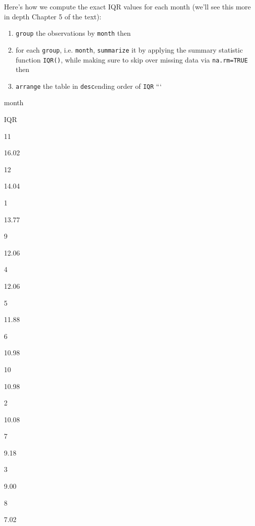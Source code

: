 \documentclass[12pt,]{krantz}
\makeatletter
\newenvironment{Shaded}{\begin{snugshade}}{\end{snugshade}}
\newcommand{\KeywordTok}[1]{\textcolor[rgb]{0.27,0.27,0.27}{\textbf{#1}}}
\newcommand{\DataTypeTok}[1]{\textcolor[rgb]{0.27,0.27,0.27}{#1}}
\newcommand{\StringTok}[1]{\textcolor[rgb]{0.5,0.5,0.5}{#1}}
\newcommand{\OtherTok}[1]{\textcolor[rgb]{0.37,0.37,0.37}{#1}}
\newcommand{\OperatorTok}[1]{\textcolor[rgb]{0.43,0.43,0.43}{\textbf{#1}}}
\newcommand{\NormalTok}[1]{#1}
\providecommand{\tightlist}{%
  \setlength{\itemsep}{0pt}\setlength{\parskip}{0pt}}
\newenvironment{kframe}{%
\medskip{}
\setlength{\fboxsep}{.8em}
 \def\at@end@of@kframe{}%
 \ifinner\ifhmode%
  \def\at@end@of@kframe{\end{minipage}}%
  \begin{minipage}{\columnwidth}%
 \fi\fi%
 \def\FrameCommand##1{\hskip\@totalleftmargin \hskip-\fboxsep
 \colorbox{shadecolor}{##1}\hskip-\fboxsep
     \hskip-\linewidth \hskip-\@totalleftmargin \hskip\columnwidth}%
 \MakeFramed {\advance\hsize-\width
   \@totalleftmargin\z@ \linewidth\hsize
   \@setminipage}}%
 {\par\unskip\endMakeFramed%
 \at@end@of@kframe}
\renewenvironment{Shaded}{\begin{kframe}}{\end{kframe}}
\makeatother
\begin{document}
Here's how we compute the exact IQR values for each month (we'll see
this more in depth Chapter 5 of the text):

\begin{enumerate}
\def\labelenumi{\arabic{enumi}.}
\tightlist
\item
  \texttt{group} the observations by \texttt{month} then
\item
  for each \texttt{group}, i.e. \texttt{month}, \texttt{summarize} it by
  applying the summary statistic function \texttt{IQR()}, while making
  sure to skip over missing data via \texttt{na.rm=TRUE} then
\item
  \texttt{arrange} the table in \texttt{desc}ending order of
  \texttt{IQR} ```
\end{enumerate}

\begin{Shaded}
\end{Shaded}

month

IQR

11

16.02

12

14.04

1

13.77

9

12.06

4

12.06

5

11.88

6

10.98

10

10.98

2

10.08

7

9.18

3

9.00

8

7.02
\end{document}
